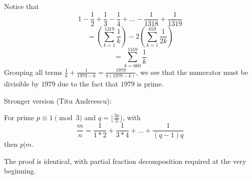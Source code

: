 Notice that
$$1-\frac{1}{2}+\frac{1}{3}-\frac{1}{4}+...-\frac{1}{1318}+\frac{1}{1319}$$
$$=\left(\sum_{k=1}^{1319}\frac{1}{k}\right)-2\left(\sum_{k=1}^{659}\frac{1}{2k}\right)$$
$$=\sum_{k=660}^{1319}\frac{1}{k}$$
Grouping all terms $\frac{1}{k}+\frac{1}{1979-k}=\frac{1979}{k(1979-k)}$, we see that the numerator must be divisible by $1979$ due to the fact that $1979$ is prime.


Stronger version (Titu Andreescu):

For prime $p\equiv 1\pmod{3}$ and $q=\lfloor \frac{2p}{3}\rfloor$, with
$$\frac{m}{n}=\frac{1}{1*2}+\frac{1}{3*4}+...+\frac{1}{(q-1)q}$$
then $p|m$.

The proof is identical, with partial fraction decomposition required at the very beginning.
